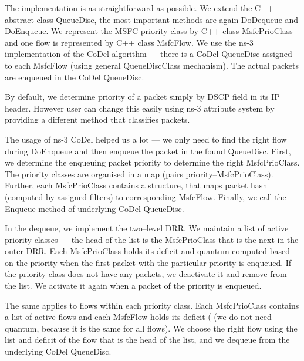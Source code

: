 
The implementation is as straightforward as possible. We extend the C++ abstract class QueueDisc, the most important methods are again DoDequeue and DoEnqueue. We represent the MSFC priority class by C++ class MsfcPrioClass and one flow is represented by C++ class MsfcFlow. We use the ns-3 implementation of the CoDel algorithm --- there is a CoDel QueueDisc assigned to each MsfcFlow (using general QueueDiscClass mechanism). The actual packets are enqueued in the CoDel QueueDisc.

By default, we determine priority of a packet simply by DSCP field in its IP header. However user can change this easily using ns-3 attribute system by providing a different method that classifies packets. 

The usage of ns-3 CoDel helped us a lot --- we only need to find the right flow during DoEnqueue and then enqueue the packet in the found QueueDisc. First, we determine the enqueuing packet priority to determine the right MsfcPrioClass. The priority classes are organised in a map (pairs priority--MsfcPrioClass). Further, each MsfcPrioClass contains a structure, that maps packet hash (computed by assigned filters) to corresponding MsfcFlow. Finally, we call the Enqueue method of underlying CoDel QueueDisc.

In the dequeue, we implement the two--level DRR. We maintain a list of active priority classes --- the head of the list is the MsfcPrioClass that is the next in the outer DRR. Each MsfcPrioClass holds its deficit and quantum computed based on the priority when the first packet with the particular priority is enqueued. If the priority class does not have any packets, we deactivate it and remove from the list. We activate it again when a packet of the priority is enqueued.  

The same applies to flows within each priority class. Each MsfcPrioClass contains a list of active flows and each MsfcFlow holds its deficit ( (we do not need quantum, because it is the same for all flows). We choose the right flow using the list and deficit of the flow that is the head of the list, and we dequeue from the underlying CoDel QueueDisc.   












